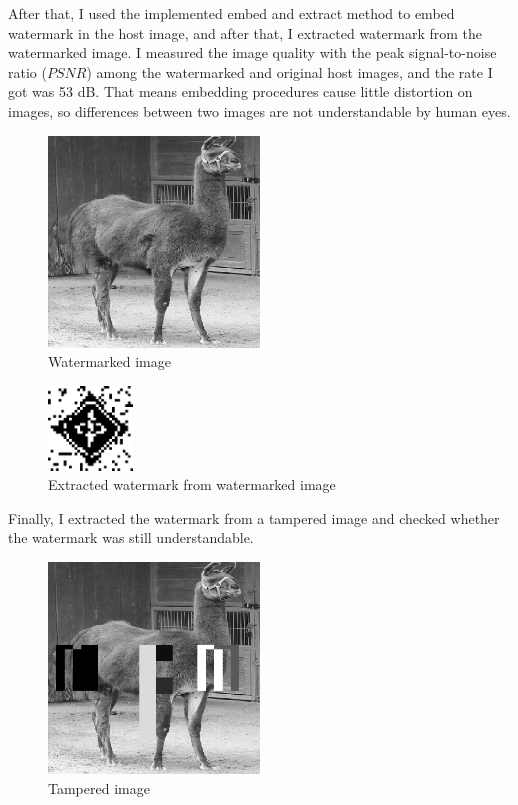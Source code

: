 \documentclass[conference]{IEEEtran}
\begin{document}
After that, I used the implemented embed and extract method to embed watermark in the host image, and after that, I extracted watermark from the watermarked image. I measured the image quality with the peak signal-to-noise ratio ($PSNR$) among the watermarked and original host images, and the rate I got was 53 dB. That means embedding procedures cause little distortion on images, so differences between two images are not understandable by human eyes.
\newpage
\begin{figure}[h]
    \centering
    \includegraphics[width=0.5\textwidth, angle=0]{images/output_watermarked_image.png}
    \caption{Watermarked image}
    \label{fig3}
\end{figure}

\begin{figure}[h]
    \centering
    \includegraphics[width=0.2\textwidth, angle=0]{images/output_watermark_extracted.png}
    \caption{Extracted watermark from watermarked image}
    \label{fig4}
\end{figure}

Finally, I extracted the watermark from a tampered image and checked whether the watermark was still understandable.
\newpage

\begin{figure}[h]
    \centering
    \includegraphics[width=0.5\textwidth, angle=0]{images/output_tampered_image.png}
    \caption{Tampered image}
    \label{fig5}
\end{figure}
\end{document}
